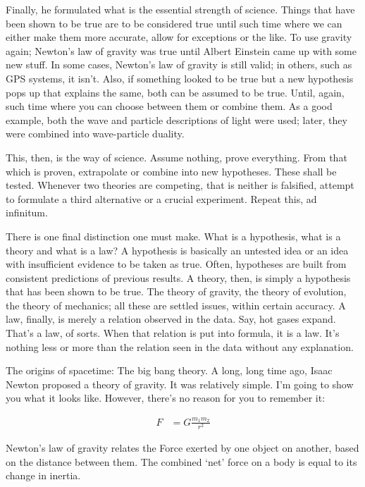 \begin{multicols}{2}
Finally, he formulated what is the essential strength of science. Things that have been shown to be true are to be considered true until such time where we can either make them more accurate, allow for exceptions or the like. To use gravity again; Newton's law of gravity was true until Albert Einstein came up with some new stuff. In some cases, Newton's law of gravity is still valid; in others, such as GPS systems, it isn't. Also, if something looked to be true but a new hypothesis pops up that explains the same, both can be assumed to be true. Until, again, such time where you can choose between them or combine them. As a good example, both the wave and particle descriptions of light were used; later, they were combined into wave-particle duality.

This, then, is the way of science. Assume nothing, prove everything. From that which is proven, extrapolate or combine into new hypotheses. These shall be tested. Whenever two theories are competing, that is neither is falsified, attempt to formulate a third alternative or a crucial experiment. Repeat this, ad infinitum.

There is one final distinction one must make. What is a hypothesis, what is a theory and what is a law? A hypothesis is basically an untested idea or an idea with insufficient evidence to be taken as true. Often, hypotheses are built from consistent predictions of previous results. A theory, then, is simply a hypothesis that has been shown to be true. The theory of gravity, the theory of evolution, the theory of mechanics; all these are settled issues, within certain accuracy. A law, finally, is merely a relation observed in the data. Say, hot gases expand. That's a law, of sorts. When that relation is put into formula, it is a law. It's nothing less or more than the relation seen in the data without any explanation.

The origins of spacetime: The big bang theory.
A long, long time ago, Isaac Newton proposed a theory of gravity. It was relatively simple. I'm going to show you what it looks like. However, there's no reason for you to remember it:

\begin{align}
F &= G \frac{m_1 m_2}{r^2}
\end{align}

Newton's law of gravity relates the Force exerted by one object on another, based on the distance between them. The combined `net' force on a body is equal to its change in inertia. 


\end{multicols}
